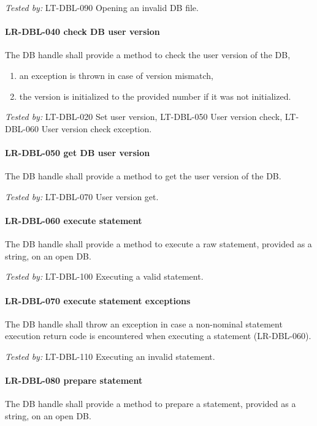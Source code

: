 \textit{Tested by: } LT-DBL-090 Opening an invalid DB file.

\paragraph{LR-DBL-040 check DB user version}
The DB handle shall provide a method to check the user version of the DB,
\begin{enumerate}
\item an exception is thrown in case of version mismatch,
\item the version is initialized to the provided number if it was not
      initialized.
\end{enumerate}

\textit{Tested by: } LT-DBL-020 Set user version,
LT-DBL-050 User version check,
LT-DBL-060 User version check exception.

\paragraph{LR-DBL-050 get DB user version}
The DB handle shall provide a method to get the user version of the DB.

\textit{Tested by: } LT-DBL-070 User version get.

\paragraph{LR-DBL-060 execute statement}
The DB handle shall provide a method to execute a raw statement, provided
as a string, on an open DB.

\textit{Tested by: } LT-DBL-100 Executing a valid statement.

\paragraph{LR-DBL-070 execute statement exceptions}
The DB handle shall throw an exception in case a non-nominal statement
execution return code is encountered when executing a statement (LR-DBL-060).

\textit{Tested by: } LT-DBL-110 Executing an invalid statement.

\paragraph{LR-DBL-080 prepare statement}
The DB handle shall provide a method to prepare a statement, provided
as a string, on an open DB.

